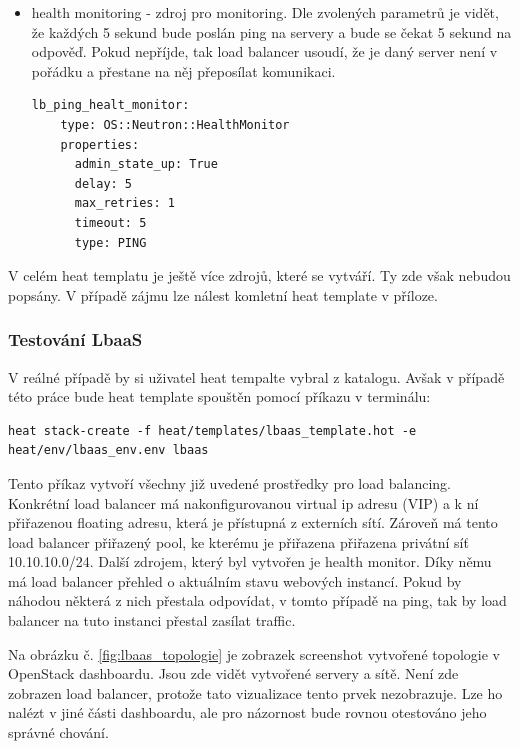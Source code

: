 \begin{itemize}
\item health monitoring - zdroj pro monitoring. Dle zvolených parametrů je vidět, že každých 5 sekund bude poslán ping na servery a bude se čekat 5 sekund na odpověď. Pokud nepříjde, tak load balancer usoudí, že je daný server není v pořádku a přestane na něj přeposílat komunikaci.

\begin{lstlisting}[caption=Monitor]
  lb_ping_healt_monitor:
    type: OS::Neutron::HealthMonitor
    properties:
      admin_state_up: True
      delay: 5
      max_retries: 1
      timeout: 5
      type: PING
\end{lstlisting}
\end{itemize}

V celém heat templatu je ještě více zdrojů, které se vytváří. Ty zde však nebudou popsány. V případě zájmu lze nálest komletní heat template v příloze. 

\subsubsection{Testování LbaaS}\label{sub:interaction}

V reálné případě by si uživatel heat tempalte vybral z katalogu. Avšak v případě této práce bude heat template spouštěn pomocí příkazu v terminálu:

\begin{lstlisting}
heat stack-create -f heat/templates/lbaas_template.hot -e heat/env/lbaas_env.env lbaas
\end{lstlisting}

Tento příkaz vytvoří všechny již uvedené prostředky pro load balancing. Konkrétní load balancer má nakonfigurovanou virtual ip adresu (VIP) a k ní přiřazenou floating adresu, která je přístupná z externích sítí. Zároveň má tento load balancer přiřazený pool, ke kterému je přiřazena přiřazena privátní síť 10.10.10.0/24. Další zdrojem, který byl vytvořen je health monitor. Díky němu má load balancer přehled o aktuálním stavu webových instancí. Pokud by náhodou některá z nich přestala odpovídat, v tomto případě na ping, tak by load balancer na tuto instanci přestal zasílat traffic.

Na obrázku č. \ref{fig:lbaas_topologie} je zobrazek screenshot vytvořené topologie v OpenStack dashboardu. Jsou zde vidět vytvořené servery a sítě. Není zde zobrazen load balancer, protože tato vizualizace tento prvek nezobrazuje. Lze ho nalézt v jiné části dashboardu, ale pro názornost bude rovnou otestováno jeho správné chování.

